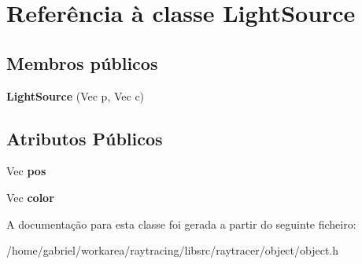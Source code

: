 \hypertarget{classLightSource}{}\section{Referência à classe Light\+Source}
\label{classLightSource}
\subsection*{Membros públicos}
\begin{DoxyCompactItemize}
\item 
\mbox{\label{classLightSource_a0caf4cbfb23525a87d4918e73c440e0e}} 
{\bfseries Light\+Source} (Vec p, Vec c)
\end{DoxyCompactItemize}
\subsection*{Atributos Públicos}
\begin{DoxyCompactItemize}
\item 
\mbox{\label{classLightSource_aab1890cf682612a28d12d8323e94db39}} 
Vec {\bfseries pos}
\item 
\mbox{\label{classLightSource_a6438b2de502fb184234d5e70f5d0be49}} 
Vec {\bfseries color}
\end{DoxyCompactItemize}


A documentação para esta classe foi gerada a partir do seguinte ficheiro\+:\begin{DoxyCompactItemize}
\item 
/home/gabriel/workarea/raytracing/libsrc/raytracer/object/object.\+h\end{DoxyCompactItemize}
